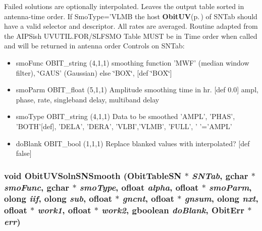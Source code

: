 Failed solutions are optionally interpolated. Leaves the output table sorted in antenna-time order. If Smo\-Type='VLMB the host {\bf Obit\-UV}{\rm (p.\,\pageref{structObitUV})} of SNTab should have a valid selector and descriptor. All rates are averaged. Routine adapted from the AIPSish UVUTIL.FOR/SLFSMO Table MUST be in Time order when called and will be returned in antenna order Controls on SNTab: \begin{itemize}
\item smo\-Func OBIT\_\-string (4,1,1) smoothing function 'MWF' (median window filter), \char`\"{}GAUS' (Gaussian) else \char`\"{}BOX\char`\"{}, [def \char`\"{}BOX\char`\"{}] \item smo\-Parm OBIT\_\-float (5,1,1) Amplitude smoothing time in hr. [def 0.0] ampl, phase, rate, singleband delay, multiband delay \item smo\-Type OBIT\_\-string (4,1,1) Data to be smoothed 'AMPL', 'PHAS', 'BOTH'[def], 'DELA', 'DERA', 'VLBI','VLMB', 'FULL', ' '='AMPL' \item do\-Blank OBIT\_\-bool (1,1,1) Replace blanked values with interpolated? [def false] 
\end{itemize}
\subsubsection{\setlength{\rightskip}{0pt plus 5cm}void Obit\-UVSoln\-SNSmooth ({\bf Obit\-Table\-SN} $\ast$ {\em SNTab}, gchar $\ast$ {\em smo\-Func}, gchar $\ast$ {\em smo\-Type}, {\bf ofloat} {\em alpha}, {\bf ofloat} $\ast$ {\em smo\-Parm}, {\bf olong} {\em iif}, {\bf olong} {\em sub}, {\bf ofloat} $\ast$ {\em gncnt}, {\bf ofloat} $\ast$ {\em gnsum}, {\bf olong} {\em nxt}, {\bf ofloat} $\ast$ {\em work1}, {\bf ofloat} $\ast$ {\em work2}, gboolean {\em do\-Blank}, {\bf Obit\-Err} $\ast$ {\em err})}\label{ObitUVSoln_8h_a31}



